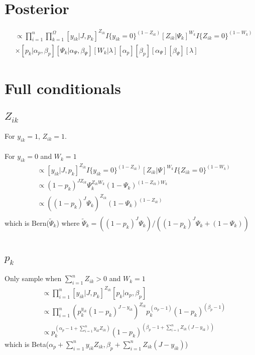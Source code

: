 \documentclass[fleqn]{article}
\def\bm#1{\mbox{\boldmath $#1$}}
\begin{document}
\section{Posterior}
%
\begin{align*}
  [\bm{Z}, \bm{p}, \bm{\Psi}, \bm{W}, \alpha_p, \beta_p, \alpha_\Psi, \beta_\Psi, \lambda | \bm{y}, J] & \propto \prod_{i = 1}^n \prod_{k = 1}^\Omega [y_{ik} | J, p_k]^{Z_{ik}} I\{y_{ik} = 0 \}^{(1 -  Z_{ik})} [Z_{ik} | \Psi_k]^{W_k} I\{Z_{ik} = 0 \}^{(1 -  W_k)}\\
  & \times [p_k | \alpha_p, \beta_p] [\Psi_k | \alpha_\Psi, \beta_\Psi] [W_k | \lambda] [\alpha_p] [\beta_p] [\alpha_\Psi] [\beta_\Psi] [\lambda]
\end{align*}
%
\section{Full conditionals}
%
\subsection{$Z_{ik}$}
%
For $y_{ik} = 1$, $Z_{ik} = 1$.\\
\\
For $y_{ik} = 0$ and $W_k = 1$
\begin{align*}
  [Z_{ik} | \cdot] & \propto [y_{ik} | J, p_k]^{Z_{ik}} I \{y_{ik} = 0 \}^{(1 - Z_{ik})} [Z_{ik} | \Psi]^{W_k} I \{Z_{ik} = 0 \}^{(1 - W_{k})}\\
  & \propto (1 - p_k)^{J Z_{ik}} \Psi_k^{Z_{ik} W_k} (1 - \Psi_k)^{(1 - Z_{ik}) W_k}\\
  & \propto \left( (1 - p_k)^J \Psi_k \right)^{Z_{ik}} \left(1 - \Psi_k \right)^{(1 - Z_{ik})}\\
\end{align*}
which is Bern($\tilde{\Psi}_k$) where $\tilde{\Psi}_k = \left( (1 - p_k)^J \Psi_k \right) / \left( (1 - p_k)^J \Psi_k + (1 - \Psi_k)\right)$\\
\\
%
\subsection{$p_k$}
%
Only sample when $\sum_{i = 1}^n Z_{ik} > 0$ and $W_k = 1$
\begin{align*}
  [p_k | \cdot] & \propto \prod_{i = 1}^n [y_{ik} | J, p_k]^{Z_{ik}} [p_k | \alpha_p, \beta_p]\\
  & \propto \prod_{i = 1}^n \left( p_k^{y_{ik}} (1 - p_k)^{J - y_{ik}} \right)^{Z_{ik}} p_k^{(\alpha_p - 1)} (1 - p_k)^{(\beta_p - 1)}\\
    & \propto p_k^{\left( \alpha_p - 1 + \sum_{i = 1}^n y_{ik} Z_{ik} \right)} (1 - p_k)^{\left( \beta_p - 1 + \sum_{i = 1}^n Z_{ik} (J - y_{ik}) \right)}
\end{align*}
%
which is Beta($\alpha_p + \sum_{i = 1}^n y_{ik} Z_{ik}, \beta_p + \sum_{i = 1}^n Z_{ik} (J - y_{ik})$)
%
\end{document}
